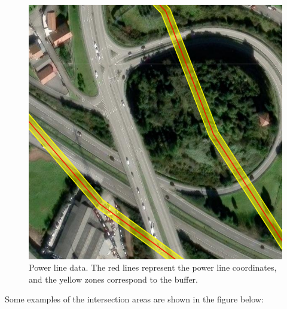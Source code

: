 \begin{figure}[H]
 \centering
 \includegraphics[scale=0.49]{IMAGENES/IMG22-PowerLine2.png}
 \captionsetup{font=large}
 \caption {Power line data. The red lines represent the power line coordinates, and the yellow zones correspond to the buffer.}
\end{figure}

Some examples of the intersection areas are shown in the figure below: 

